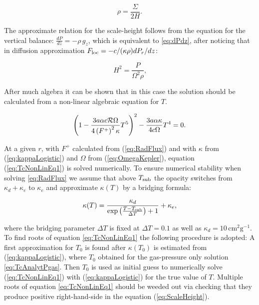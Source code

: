 \documentclass[12pt,english,preprint]{aastex}
\newcommand{\su}[2]{#1_{\rm #2}}
\newcommand{\Tc}{T}
\begin{document}
\begin{equation}
{\displaystyle \rho=\frac{\Sigma}{2H}}\label{eq:rhoEqSigmaOver2H}\mbox{.}
\end{equation}

\noindent The approximate relation for the scale-height follows from
the equation for the vertical balance:
$\displaystyle \frac{dP}{dz}=-\rho\,g_{z}$,
which is equivalent to \eqref{eq:dPdz}, after noticing that in diffusion approximation 
$\displaystyle \su{F}{loc}=-c/(\kappa\rho)dP_r/dz$:

  
\begin{equation}
{\displaystyle H^{2}=\frac{P}{\Omega^{2}\rho}\mbox{,}}\label{eq:ScaleHeight}
\end{equation}

After much algebra it can be shown that in this case the solution should be calculated from 
a non-linear algebraic equation for $\Tc$.

\begin{equation}
\left(1-\frac{3a\alpha c{\cal R}\Omega}{4\left(F^{+}\right)^{2}\kappa}
\Tc^{5}\right)^{2}-\frac{3a\alpha\kappa}{4c\Omega}\Tc^{4}=0\mbox{.}
\label{eq:TcNonLinEq1}
\end{equation}

At a given $r$, with $F^{+}$ calculated from (\ref{eq:RadFlux})
and with $\kappa$ from (\ref{eq:kappaLogistic}) and $\Omega$ from
(\ref{eq:OmegaKepler}), equation (\ref{eq:TcNonLinEq1}) is solved
numerically. 
To ensure numerical stability when solving \eqref{eq:RadFlux}
we assume that above $T_{{\rm sub}}$ the opacity switches from $\kappa_{d}+\kappa_{e}$ to
$\kappa_{e}$  and approximate $\kappa(T)$ by a bridging formula:

\begin{equation}
\kappa(T)=\frac{\kappa_d}
{\exp\left(
  \frac{T-\su{T}{sub}}{\Delta T}
  \right)+1} + \kappa_e
\mbox{,}
\label{eq:kappaLogistic}
\end{equation}


\noindent where the bridging parameter $\Delta T$ is fixed at $\Delta T=0.1$ as well as $\kappa_{d}=10\,\text{cm}^{2}\text{g}^{-1}$.
To find roots of equation \eqref{eq:TcNonLinEq1} the following
procedure is adopted:
A first approximation for $T_0$
is found after $\kappa(T_0)$ is estimated from (\ref{eq:kappaLogistic}), 
where $T_0$ obtained
for the gas-pressure only solution \eqref{eq:TcAnalytPgas}.
Then $T_0$ is used as initial guess to numerically 
solve (\ref{eq:TcNonLinEq1}) with (\ref{eq:kappaLogistic}) 
for the true value of $T$.
Multiple roots of equation \eqref{eq:TcNonLinEq1} should be weeded out via checking that
they produce positive right-hand-side in the equation (\ref{eq:ScaleHeight}).
\end{document}
